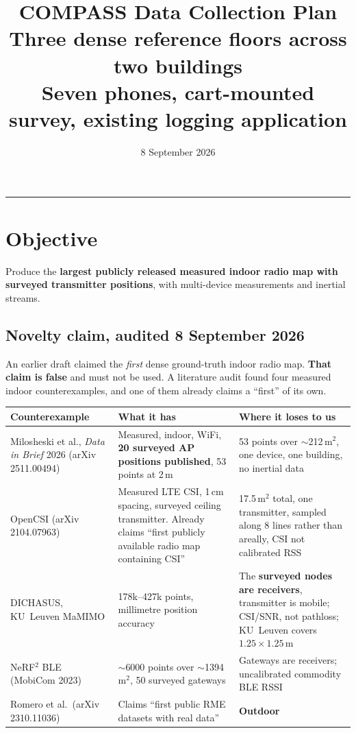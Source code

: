 \documentclass[11pt,a4paper]{article}
\title{\vspace{-1.4cm}\textbf{COMPASS Data Collection Plan}\\[1.5mm]
\large Three dense reference floors across two buildings\\
\normalsize Seven phones, cart-mounted survey, existing logging application}
\date{8 September 2026}\author{}
\newcommand{\B}[1]{\textcolor{bad}{\textbf{#1}}}
\begin{document}
\maketitle\vspace{-8mm}\hrule\vspace{3mm}

\section{Objective}

Produce the \textbf{largest publicly released measured indoor radio map with surveyed
transmitter positions}, with multi-device measurements and inertial streams.

\subsection{Novelty claim, audited 8 September 2026}

An earlier draft claimed the \emph{first} dense ground-truth indoor radio map. \B{That
claim is false} and must not be used. A literature audit found four measured indoor
counterexamples, and one of them already claims a ``first'' of its own.

\begin{center}\small
\begin{tabular}{@{}p{4.3cm}p{5.0cm}p{6.4cm}@{}}
\toprule
Counterexample & What it has & Where it loses to us \\ \midrule
Milosheski et al., \emph{Data in Brief} 2026 (arXiv 2511.00494) & Measured, indoor, WiFi,
\textbf{20 surveyed AP positions published}, 53 points at 2\,m & 53 points over
$\sim$212\,m$^2$, one device, one building, no inertial data \\
OpenCSI (arXiv 2104.07963) & Measured LTE CSI, 1\,cm spacing, surveyed ceiling
transmitter. Already claims ``first publicly available radio map containing CSI'' &
17.5\,m$^2$ total, one transmitter, sampled along 8 lines rather than areally, CSI not
calibrated RSS \\
DICHASUS, KU~Leuven MaMIMO & 178k--427k points, millimetre position accuracy &
The \textbf{surveyed nodes are receivers}, transmitter is mobile; CSI/SNR, not pathloss;
KU~Leuven covers $1.25\times1.25$\,m \\
NeRF$^2$ BLE (MobiCom 2023) & $\sim$6000 points over $\sim$1394\,m$^2$, 50 surveyed
gateways & Gateways are receivers; uncalibrated commodity BLE RSSI \\
Romero et al.\ (arXiv 2310.11036) & Claims ``first public RME datasets with real data'' &
\textbf{Outdoor} \\
\bottomrule
\end{tabular}
\end{center}
\end{document}
